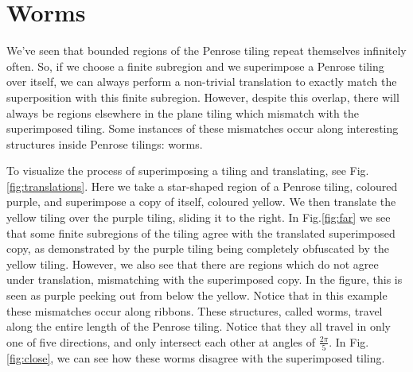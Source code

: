 \documentclass[
  oneside,
  11pt, a4paper,
  footinclude=true,
  headinclude=true,
  cleardoublepage=empty
]{scrbook}
\begin{document}
\section{Worms} 

We've seen that bounded regions of the Penrose tiling repeat themselves infinitely often. So, if we choose a finite subregion and we superimpose a Penrose tiling over itself, we can always perform a non-trivial translation to exactly match the superposition with this finite subregion. However, despite this overlap, there will always be regions elsewhere in the plane tiling which mismatch with the superimposed tiling. Some instances of these mismatches occur along interesting structures inside Penrose tilings: worms.

To visualize the process of superimposing a tiling and translating, see Fig.\ref{fig:translations}. Here we take a star-shaped region of a Penrose tiling, coloured purple, and superimpose a copy of itself, coloured yellow. We then translate the yellow tiling over the purple tiling, sliding it to the right. In Fig.\ref{fig:far} we see that some finite subregions of the tiling agree with the translated superimposed copy, as demonstrated by the purple tiling being completely obfuscated by the yellow tiling. However, we also see that there are regions which do not agree under translation, mismatching with the superimposed copy. In the figure, this is seen as purple peeking out from below the yellow. Notice that in this example these mismatches occur along ribbons. These structures, called worms, travel along the entire length of the Penrose tiling. Notice that they all travel in only one of five directions, and only intersect each other at angles of $\frac{2\pi}{5}$. In Fig.\ref{fig:close}, we can see how these worms disagree with the superimposed tiling.
\end{document}
